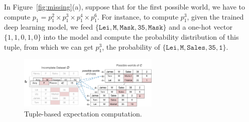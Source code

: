 
\begin{example}
	In Figure~\ref{fig:missing}(a), suppose that for the first possible world, we have to compute $p_1 = p_1^2 \times  p_1^3 \times  p_1^4 \times  p_1^6$. For instance, to compute $p_1^3$, given the trained deep learning model, we feed 
	$\{\texttt{Lei}, \texttt{M}, \texttt{Mask}, \texttt{35}, \texttt{Mask}\}$ and a one-hot vector $\{1,1,0,1,0\}$  into the model and compute the probability distribution of this tuple, from which we can get $p_1^3$, \ie the probability of 	$\{\texttt{Lei}, \texttt{M}, \texttt{Sales}, \texttt{35}, \texttt{1}\}$.
\end{example}


\begin{figure}[t]
 \centering
 \includegraphics[width=0.6\textwidth]{figs/expectation}
 \caption{Tuple-based expectation computation.}
 \label{fig:expectation}
\end{figure}

